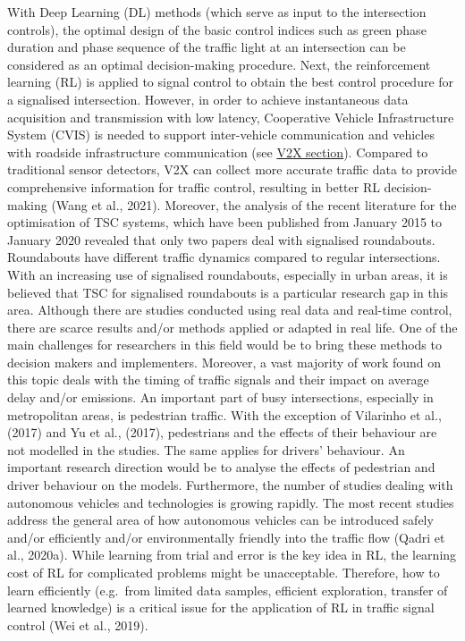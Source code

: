\documentclass[
]{book}
\begin{document}
With Deep Learning (DL) methods (which serve as input to the intersection controls), the optimal design of the basic control indices such as green phase duration and phase sequence of the traffic light at an intersection can be considered as an optimal decision-making procedure. Next, the reinforcement learning (RL) is applied to signal control to obtain the best control procedure for a signalised intersection. However, in order to achieve instantaneous data acquisition and transmission with low latency, Cooperative Vehicle Infrastructure System (CVIS) is needed to support inter-vehicle communication and vehicles with roadside infrastructure communication (see \protect\hyperlink{v2x}{V2X section}). Compared to traditional sensor detectors, V2X can collect more accurate traffic data to provide comprehensive information for traffic control, resulting in better RL decision-making (Wang et al., 2021).
Moreover, the analysis of the recent literature for the optimisation of TSC systems, which have been published from January 2015 to January 2020 revealed that only two papers deal with signalised roundabouts. Roundabouts have different traffic dynamics compared to regular intersections. With an increasing use of signalised roundabouts, especially in urban areas, it is believed that TSC for signalised roundabouts is a particular research gap in this area. Although there are studies conducted using real data and real-time control, there are scarce results and/or methods applied or adapted in real life. One of the main challenges for researchers in this field would be to bring these methods to decision makers and implementers.
Moreover, a vast majority of work found on this topic deals with the timing of traffic signals and their impact on average delay and/or emissions. An important part of busy intersections, especially in metropolitan areas, is pedestrian traffic. With the exception of Vilarinho et al., (2017) and Yu et al., (2017), pedestrians and the effects of their behaviour are not modelled in the studies. The same applies for drivers' behaviour. An important research direction would be to analyse the effects of pedestrian and driver behaviour on the models.
Furthermore, the number of studies dealing with autonomous vehicles and technologies is growing rapidly. The most recent studies address the general area of how autonomous vehicles can be introduced safely and/or efficiently and/or environmentally friendly into the traffic flow
(Qadri et al., 2020a).
While learning from trial and error is the key idea in RL, the learning cost of RL for complicated problems might be unacceptable. Therefore, how to learn efficiently (e.g.~from limited data samples, efficient exploration, transfer of learned knowledge) is a critical issue for the application of RL in traffic signal control (Wei et al., 2019).
\end{document}
